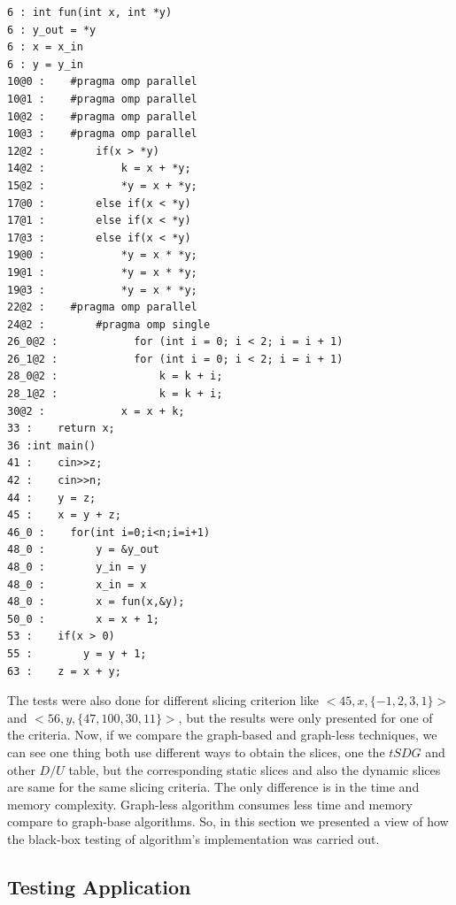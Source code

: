 \documentclass[conference]{IEEEtran}
\begin{document}
\begin{lstlisting}
6 : int fun(int x, int *y)
6 : y_out = *y
6 : x = x_in
6 : y = y_in
10@0 :    #pragma omp parallel
10@1 :    #pragma omp parallel
10@2 :    #pragma omp parallel
10@3 :    #pragma omp parallel
12@2 :        if(x > *y) 
14@2 :            k = x + *y;
15@2 :            *y = x + *y;
17@0 :        else if(x < *y)
17@1 :        else if(x < *y)
17@3 :        else if(x < *y)
19@0 :            *y = x * *y;
19@1 :            *y = x * *y;
19@3 :            *y = x * *y;
22@2 :    #pragma omp parallel 
24@2 :        #pragma omp single
26_0@2 :            for (int i = 0; i < 2; i = i + 1)
26_1@2 :            for (int i = 0; i < 2; i = i + 1)
28_0@2 :                k = k + i;
28_1@2 :                k = k + i;
30@2 :            x = x + k;
33 :    return x;
36 :int main() 
41 :    cin>>z;
42 :    cin>>n;
44 :    y = z;
45 :    x = y + z;
46_0 :    for(int i=0;i<n;i=i+1)
48_0 :        y = &y_out
48_0 :        y_in = y
48_0 :        x_in = x
48_0 :        x = fun(x,&y);
50_0 :        x = x + 1;
53 :    if(x > 0)
55 :        y = y + 1;
63 :    z = x + y;
\end{lstlisting}

The tests were also done for different slicing criterion like $<45,x,\{-1,2,3,1\}>$ and $<56,y,\{47,100,30,11\}>$, but the results were only presented for one of the criteria. Now, if we compare the graph-based and graph-less techniques, we can see one thing both use different ways to obtain the slices, one the $tSDG$ and other $D/U$ table, but the corresponding static slices and also the dynamic slices are same for the same slicing criteria. The only difference is in the time and memory complexity. Graph-less algorithm consumes less time and memory compare to graph-base algorithms. So, in this section we presented a view of how the black-box testing of algorithm's implementation was carried out. 

\subsection{Testing Application}
\end{document}
